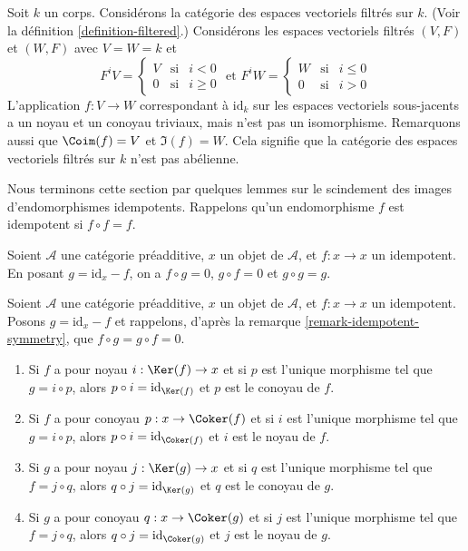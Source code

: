 \begin{example}
\label{example-not-abelian}
Soit $k$ un corps.
Considérons la catégorie
des espaces vectoriels filtrés sur $k$.
(Voir la définition \ref{definition-filtered}.)
Considérons les espaces vectoriels filtrés $(V, F)$ et $(W, F)$ avec
$V = W = k$ et
$$
F^iV
=
\left\{
\begin{matrix}
V & \text{si} & i < 0 \\
0 & \text{si} & i \geq 0
\end{matrix}
\right.
\text{ et }
F^iW
=
\left\{
\begin{matrix}
W & \text{si} & i \leq 0 \\
0 & \text{si} & i > 0
\end{matrix}
\right.
$$
L'application $f : V \to W$ correspondant à $\text{id}_k$ sur les espaces
vectoriels sous-jacents a un noyau et un conoyau triviaux, mais n'est pas
un isomorphisme. Remarquons aussi que $\Coim(f) = V$ et $\Im(f) = W$.
Cela signifie que la catégorie des espaces vectoriels filtrés sur $k$
n'est pas abélienne.
\end{example}

\noindent
Nous terminons cette section par quelques lemmes sur le scindement des images
d'endomorphismes idempotents. Rappelons qu'un endomorphisme $f$
est idempotent si $f \circ f = f$.

\begin{remark}
\label{remark-idempotent-symmetry}
Soient $\mathcal{A}$ une catégorie préadditive,
$x$ un objet de $\mathcal{A}$,
et $f : x \to x$ un idempotent.
En posant $g = \text{id} _ x - f$,
on a $f \circ g = 0$, $g \circ f = 0$ et $g \circ g = g$.
\end{remark}

\begin{lemma}
\label{lemma-idempotent-kernel-cokernel}
Soient $\mathcal{A}$ une catégorie préadditive,
$x$ un objet de $\mathcal{A}$,
et $f : x \to x$ un idempotent.
Posons $g = \text{id} _ x - f$
et rappelons, d'après la remarque \ref{remark-idempotent-symmetry},
que $f \circ g = g \circ f = 0$.
\begin{enumerate}
\item Si $f$ a pour noyau $i : \Ker (f) \to x$
et si $p$ est l'unique morphisme tel que $g = i \circ p$,
alors $p \circ i = \text{id} _ {\Ker (f)}$
et $p$ est le conoyau de $f$.
\item Si $f$ a pour conoyau $p : x \to \Coker (f)$
et si $i$ est l'unique morphisme tel que $g = i \circ p$,
alors $p \circ i = \text{id} _ {\Coker (f)}$
et $i$ est le noyau de $f$.
\item Si $g$ a pour noyau $j : \Ker (g) \to x$
et si $q$ est l'unique morphisme tel que $f = j \circ q$,
alors $q \circ j = \text{id} _ {\Ker (g)}$
et $q$ est le conoyau de $g$.
\item Si $g$ a pour conoyau $q : x \to \Coker (g)$
et si $j$ est l'unique morphisme tel que $f = j \circ q$,
alors $q \circ j = \text{id} _ {\Coker (g)}$
et $j$ est le noyau de $g$.
\end{enumerate}
\end{lemma}

